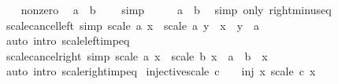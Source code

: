 \begin{isabellebody}
\ \ \isamarkupfalse%
\ nonzero\ \isamarkupfalse%
\ {\isachardoublequoteopen}a\ {\isacharminus}{\kern0pt}\ b\ {\isacharequal}{\kern0pt}\ {}{\isachardoublequoteclose}\ \isamarkupfalse%
\ simp\isanewline
\ \ \isamarkupfalse%
\ \isamarkupfalse%
\ {\isachardoublequoteopen}a\ {\isacharequal}{\kern0pt}\ b{\isachardoublequoteclose}\ \isamarkupfalse%
\ {\isacharparenleft}{\kern0pt}simp\ only{\isacharcolon}{\kern0pt}\ right{\isacharunderscore}{\kern0pt}minus{\isacharunderscore}{\kern0pt}eq{\isacharparenright}{\kern0pt}\isanewline
{}\isamarkupfalse%
%
\endisatagproof
{\isafoldproof}%
%
\isadelimproof
\isanewline
%
\endisadelimproof
\isanewline
{}\isamarkupfalse%
\ scale{\isacharunderscore}{\kern0pt}cancel{\isacharunderscore}{\kern0pt}left\ {\isacharbrackleft}{\kern0pt}simp{\isacharbrackright}{\kern0pt}{\isacharcolon}{\kern0pt}\ {\isachardoublequoteopen}scale\ a\ x\ {\isacharequal}{\kern0pt}\ scale\ a\ y\ {\isasymlongleftrightarrow}\ x\ {\isacharequal}{\kern0pt}\ y\ {\isasymor}\ a\ {\isacharequal}{\kern0pt}\ {}{\isachardoublequoteclose}\isanewline
%
\isadelimproof
\ \ %
\endisadelimproof
%
\isatagproof
{}\isamarkupfalse%
\ {\isacharparenleft}{\kern0pt}auto\ intro{\isacharcolon}{\kern0pt}\ scale{\isacharunderscore}{\kern0pt}left{\isacharunderscore}{\kern0pt}imp{\isacharunderscore}{\kern0pt}eq{\isacharparenright}{\kern0pt}%
\endisatagproof
{\isafoldproof}%
%
\isadelimproof
\isanewline
%
\endisadelimproof
\isanewline
{}\isamarkupfalse%
\ scale{\isacharunderscore}{\kern0pt}cancel{\isacharunderscore}{\kern0pt}right\ {\isacharbrackleft}{\kern0pt}simp{\isacharbrackright}{\kern0pt}{\isacharcolon}{\kern0pt}\ {\isachardoublequoteopen}scale\ a\ x\ {\isacharequal}{\kern0pt}\ scale\ b\ x\ {\isasymlongleftrightarrow}\ a\ {\isacharequal}{\kern0pt}\ b\ {\isasymor}\ x\ {\isacharequal}{\kern0pt}\ {}{\isachardoublequoteclose}\isanewline
%
\isadelimproof
\ \ %
\endisadelimproof
%
\isatagproof
{}\isamarkupfalse%
\ {\isacharparenleft}{\kern0pt}auto\ intro{\isacharcolon}{\kern0pt}\ scale{\isacharunderscore}{\kern0pt}right{\isacharunderscore}{\kern0pt}imp{\isacharunderscore}{\kern0pt}eq{\isacharparenright}{\kern0pt}%
\endisatagproof
{\isafoldproof}%
%
\isadelimproof
\isanewline
%
\endisadelimproof
\isanewline
{}\isamarkupfalse%
\ injective{\isacharunderscore}{\kern0pt}scale{\isacharcolon}{\kern0pt}\ {\isachardoublequoteopen}c\ {\isasymnoteq}\ {}\ {\isasymLongrightarrow}\ inj\ {\isacharparenleft}{\kern0pt}{\isasymlambda}x{\isachardot}{\kern0pt}\ scale\ c\ x{\isacharparenright}{\kern0pt}{\isachardoublequoteclose}\isanewline

\end{isabellebody}
